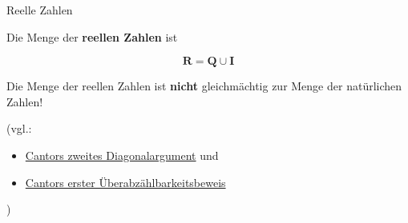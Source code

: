 \documentclass[12pt,ngerman,a4paper,ignorenonframetext,]{beamer}
\providecommand{\tightlist}{%
  \setlength{\itemsep}{0pt}\setlength{\parskip}{0pt}}
\begin{document}
\begin{frame}{Reelle Zahlen}
\protect\hypertarget{reelle-zahlen}{}

Die Menge der \textbf{reellen Zahlen} ist

\[ \mathbf{R} = \mathbf{Q} \cup \mathbf{I}\]

\begin{center}
\end{center}


\begin{Bemerkung}[]

Die Menge der reellen Zahlen ist \textbf{nicht} gleichmächtig zur Menge
der natürlichen Zahlen!

(vgl.:

\begin{itemize}
\tightlist
\item
  \href{http://tinyurl.com/p83fezm}{Cantors zweites Diagonalargument}
  und
\item
  \href{http://bit.ly/1MlpAa8}{Cantors erster Überabzählbarkeitsbeweis}
\end{itemize}

)

\end{Bemerkung}

\end{frame}
\end{document}
